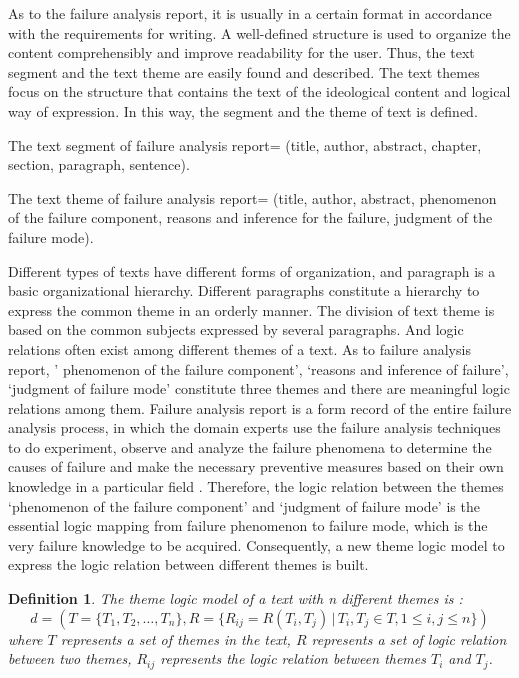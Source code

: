 \documentclass{elsart}
\newtheorem{definition}{Definition}
\begin{document}
As to the failure analysis report, it is usually in a certain format
in accordance with the requirements for writing. A well-defined structure is used to organize
the content comprehensibly and improve readability for the user. Thus,
the text segment and the text theme are easily found and
described. The text themes focus on the structure that contains the
text of the ideological content and logical way of expression. In this way, the segment and the theme of text is defined.

\begin{itshape}
  The text segment of failure analysis report= (title, author,
  abstract, chapter, section, paragraph, sentence). 

The text theme of failure analysis report= (title, author, abstract, phenomenon of the failure component, reasons and inference for the failure, judgment of the failure mode).

\end{itshape}

Different types of texts have different forms of
organization, and paragraph is a basic organizational
hierarchy. Different paragraphs constitute a hierarchy to express the
common theme in an orderly manner. The division of text theme is based
on the common subjects expressed by several paragraphs. And logic
relations often exist among different themes of a text. As to
failure analysis report, ' phenomenon of the failure component’, ‘reasons and inference of failure’, ‘judgment of failure mode’ constitute three themes and there are meaningful logic relations among them. Failure analysis report is a form record of the entire failure analysis process, in which the domain experts use the failure analysis techniques to do experiment, observe and analyze the failure phenomena to determine the causes of failure and make the necessary preventive measures based on their own knowledge in a particular field \cite{roberts1980stm}. Therefore, the logic relation between the themes ‘phenomenon of the failure component’ and ‘judgment of failure mode’ is the essential logic mapping from failure phenomenon to failure mode, which is the very failure knowledge to be acquired. Consequently, a new theme logic model to express the logic relation between different themes is built.



\begin{definition}
  The theme logic model of a text with n different themes is :
\[ d = (T = \{T_1,T_2,\ldots,T_n\}, R = \{R_{ij} = R(T_i,T_j) \, | \, T_i,T_j \in
T,1\le i,j \le n \}) \]
where $T$ represents a set of themes in the text, $R$ represents a set of logic relation between two themes, $R_{ij}$ represents the logic relation between themes $T_i$ and $T_j$. 

\end{definition}
\end{document}
